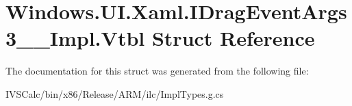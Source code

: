 \hypertarget{struct_windows_1_1_u_i_1_1_xaml_1_1_i_drag_event_args3_____impl_1_1_vtbl}{}\section{Windows.\+U\+I.\+Xaml.\+I\+Drag\+Event\+Args3\+\_\+\+\_\+\+Impl.\+Vtbl Struct Reference}
\label{struct_windows_1_1_u_i_1_1_xaml_1_1_i_drag_event_args3_____impl_1_1_vtbl}


The documentation for this struct was generated from the following file\+:\begin{DoxyCompactItemize}
\item 
I\+V\+S\+Calc/bin/x86/\+Release/\+A\+R\+M/ilc/Impl\+Types.\+g.\+cs\end{DoxyCompactItemize}
